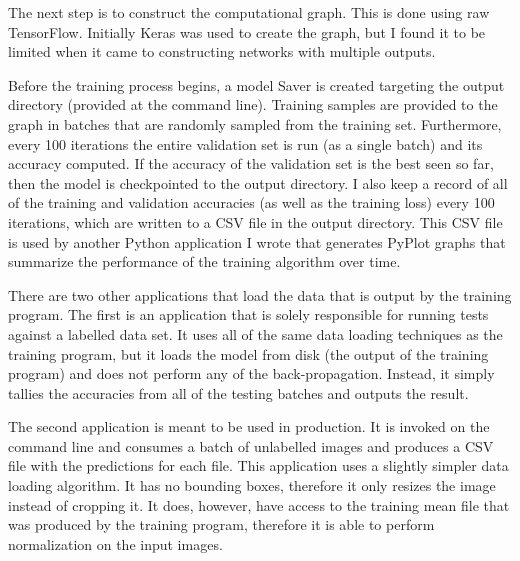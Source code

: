 \documentclass[12pt]{article}
\begin{document}
The next step is to construct the computational graph.
This is done using raw TensorFlow.
Initially Keras was used to create the graph, but I found it to be limited when it came to constructing networks with multiple outputs.

Before the training process begins, a model Saver is created targeting the output directory (provided at the command line).
Training samples are provided to the graph in batches that are randomly sampled from the training set.
Furthermore, every 100 iterations the entire validation set is run (as a single batch) and its accuracy computed.
If the accuracy of the validation set is the best seen so far, then the model is checkpointed to the output directory.
I also keep a record of all of the training and validation accuracies (as well as the training loss) every 100 iterations, which are written to a CSV file in the output directory.
This CSV file is used by another Python application I wrote that generates PyPlot graphs that summarize the performance of the training algorithm over time.

There are two other applications that load the data that is output by the training program.
The first is an application that is solely responsible for running tests against a labelled data set.
It uses all of the same data loading techniques as the training program, but it loads the model from disk (the output of the training program) and does not perform any of the back-propagation. 
Instead, it simply tallies the accuracies from all of the testing batches and outputs the result.

The second application is meant to be used in production.
It is invoked on the command line and consumes a batch of unlabelled images and produces a CSV file with the predictions for each file.
This application uses a slightly simpler data loading algorithm.
It has no bounding boxes, therefore it only resizes the image instead of cropping it. 
It does, however, have access to the training mean file that was produced by the training program, therefore it is able to perform normalization on the input images.
\end{document}
